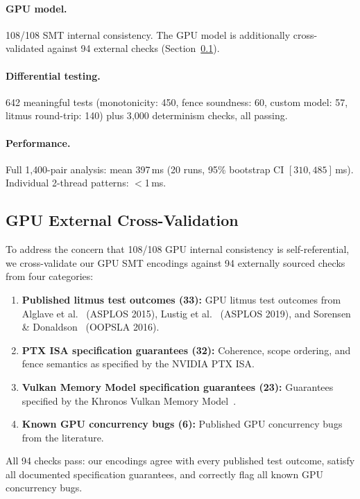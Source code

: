 \documentclass[11pt]{article}
\begin{document}
\paragraph{GPU model.}
108/108 SMT internal consistency. The GPU model is additionally
cross-validated against 94 external checks
(Section~\ref{sec:gpu-external}).

\paragraph{Differential testing.}
642 meaningful tests (monotonicity: 450, fence soundness: 60,
custom model: 57, litmus round-trip: 140) plus 3{,}000 determinism
checks, all passing.

\paragraph{Performance.}
Full 1{,}400-pair analysis: mean 397\,ms (20 runs, 95\% bootstrap CI
$[310, 485]$\,ms). Individual 2-thread patterns: $<$1\,ms.

\subsection{GPU External Cross-Validation}
\label{sec:gpu-external}

To address the concern that 108/108 GPU internal consistency is
self-referential, we cross-validate our GPU SMT encodings against
94 externally sourced checks from four categories:

\begin{enumerate}[nosep]
\item \textbf{Published litmus test outcomes (33):}
  GPU litmus test outcomes from Alglave et al.~\cite{Alglave2015GPU}
  (ASPLOS 2015), Lustig et al.~\cite{Lustig2019} (ASPLOS 2019), and
  Sorensen \& Donaldson~\cite{Sorensen2016} (OOPSLA 2016).
\item \textbf{PTX ISA specification guarantees (32):}
  Coherence, scope ordering, and fence semantics as specified
  by the NVIDIA PTX ISA.
\item \textbf{Vulkan Memory Model specification guarantees (23):}
  Guarantees specified by the Khronos Vulkan Memory
  Model~\cite{KhronosVulkan}.
\item \textbf{Known GPU concurrency bugs (6):}
  Published GPU concurrency bugs from the literature.
\end{enumerate}

\noindent
All 94 checks pass: our encodings agree with every published test
outcome, satisfy all documented specification guarantees, and correctly
flag all known GPU concurrency bugs.
\end{document}
